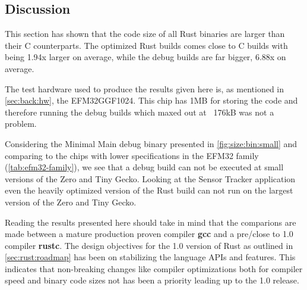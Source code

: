 \subsection{Discussion}

This section has shown that the code size of all Rust binaries are larger than their C counterparts.
The optimized Rust builds comes close to C builds with being 1.94x larger on average, while the debug builds are far bigger, 6.88x on average.

The test hardware used to produce the results given here is, as mentioned in \autoref{sec:back:hw}, the EFM32GGF1024.
This chip has 1MB for storing the code and therefore running the debug builds which maxed out at ~176kB was not a problem.

Considering the Minimal Main debug binary presented in \autoref{fig:size:bin:small} and comparing to the chips with lower specifications in the EFM32 family (\autoref{tab:efm32-family}), we see that a debug build can not be executed at small versions of the Zero and Tiny Gecko.
Looking at the Sensor Tracker application even the heavily optimized version of the Rust build can not run on the largest version of the Zero and Tiny Gecko.

Reading the results presented here should take in mind that the comparions are made between a mature production proven compiler \textbf{gcc} and a pre/close to 1.0 compiler \textbf{rustc}.
The design objectives for the 1.0 version of Rust as outlined in \autoref{sec:rust:roadmap} has been on stabilizing the language APIs and features.
This indicates that non-breaking changes like compiler optimizations both for compiler speed and binary code sizes not has been a priority leading up to the 1.0 release.
